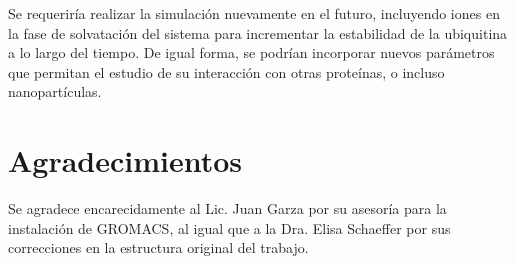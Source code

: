 \documentclass[3pt,twocolumn]{elsarticle}
\begin{document}
Se requeriría realizar la simulación nuevamente en el futuro, incluyendo iones en la fase de solvatación del sistema para incrementar la estabilidad de la ubiquitina a lo largo del tiempo. De igual forma, se podrían incorporar nuevos parámetros que permitan el estudio de su interacción con otras proteínas, o incluso nanopartículas.

\section{Agradecimientos}
Se agradece encarecidamente al Lic. Juan Garza por su asesoría para la instalación de GROMACS, al igual que a la Dra. Elisa Schaeffer por sus correcciones en la estructura original del trabajo.


\end{document}
